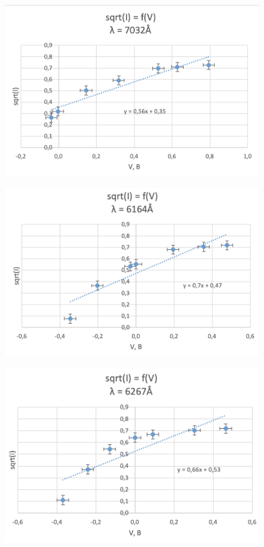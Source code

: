 \documentclass[a4paper, 12pt]{article}%
\begin{document}
\begin{enumerate}
	\begin{figure}[h!]
	    \centering
		\includegraphics[scale=0.6]{График_5.PNG}
	\end{figure}

	\newpage

	\begin{figure}[h!]
	    \centering
		\includegraphics[scale=0.6]{График_6.PNG}
	\end{figure}

	\begin{figure}[h!]
	    \centering
		\includegraphics[scale=0.6]{График_7.PNG}
	\end{figure}


\end{enumerate}
\end{document}
